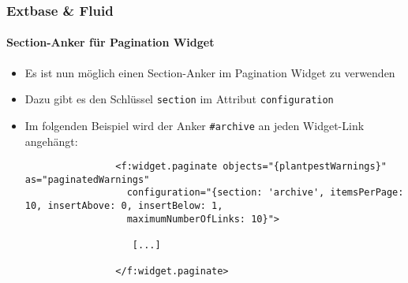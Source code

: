 %

\begin{frame}[fragile]
	\frametitle{Extbase \& Fluid}
	\framesubtitle{Section-Anker für Pagination Widget}

	\lstset{basicstyle=\tiny\ttfamily}

	\begin{itemize}

		\item Es ist nun möglich einen Section-Anker im Pagination Widget zu verwenden
		\item Dazu gibt es den Schlüssel \texttt{section} im Attribut \texttt{configuration}

		\item Im folgenden Beispiel wird der Anker \texttt{\#archive} an jeden Widget-Link angehängt:

			\begin{lstlisting}
				<f:widget.paginate objects="{plantpestWarnings}" as="paginatedWarnings"
				  configuration="{section: 'archive', itemsPerPage: 10, insertAbove: 0, insertBelow: 1,
				  maximumNumberOfLinks: 10}">

				   [...]

				</f:widget.paginate>
			\end{lstlisting}

	\end{itemize}

\end{frame}


